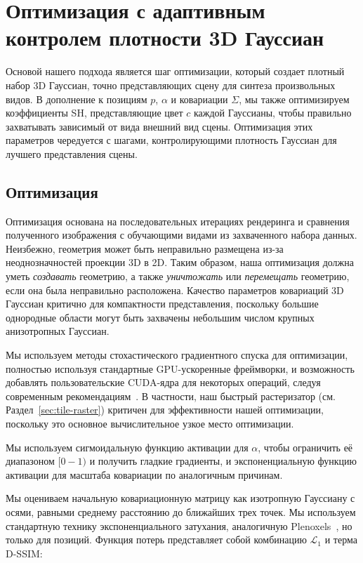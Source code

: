 \section{Оптимизация с адаптивным контролем плотности 3D Гауссиан}
\label{sec:opt-dens}

Основой нашего подхода является шаг оптимизации, который создает плотный набор 3D Гауссиан, точно представляющих сцену для синтеза произвольных видов.
В дополнение к позициям $p$, $\alpha$ и ковариации $\Sigma$, мы также оптимизируем коэффициенты SH, представляющие цвет $c$ каждой Гауссианы, чтобы правильно захватывать зависимый от вида внешний вид сцены. 
Оптимизация этих параметров чередуется с шагами, контролирующими плотность Гауссиан для лучшего представления сцены.

\subsection{Оптимизация}

Оптимизация основана на последовательных итерациях рендеринга и сравнения полученного изображения с обучающими видами из захваченного набора данных. Неизбежно, геометрия может быть неправильно размещена из-за неоднозначностей проекции 3D в 2D. Таким образом, наша оптимизация должна уметь \emph{создавать} геометрию, а также \emph{уничтожать} или \emph{перемещать} геометрию, если она была неправильно расположена. Качество параметров ковариаций 3D Гауссиан критично для компактности представления, поскольку большие однородные области могут быть захвачены небольшим числом крупных анизотропных Гауссиан.

Мы используем методы стохастического градиентного спуска для оптимизации, полностью используя стандартные GPU-ускоренные фреймворки, и возможность добавлять пользовательские CUDA-ядра для некоторых операций, следуя современным рекомендациям~\cite{plenoxels,dvgo-cvpr2022}. В частности, наш быстрый растеризатор (см. Раздел~\ref{sec:tile-raster}) критичен для эффективности нашей оптимизации, поскольку это основное вычислительное узкое место оптимизации.

Мы используем сигмоидальную функцию активации для $\alpha$, чтобы ограничить её диапазоном $[0-1)$ и получить гладкие градиенты, и экспоненциальную функцию активации для масштаба ковариации по аналогичным причинам.

Мы оцениваем начальную ковариационную матрицу как изотропную Гауссиану с осями, равными среднему расстоянию до ближайших трех точек. 
Мы используем стандартную технику экспоненциального затухания, аналогичную Plenoxels~\cite{plenoxels}, но только для позиций. Функция потерь представляет собой комбинацию $\mathcal{L}_1$ и терма D-SSIM:


